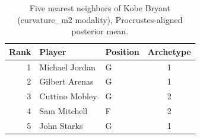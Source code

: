 \begin{table}[htbp]
  \centering\small
  \begin{tabular}{rllc}
    \toprule
    Rank & Player & Position & Archetype \\
    \midrule
    1 & Michael Jordan & G & 1 \\
    2 & Gilbert Arenas & G & 1 \\
    3 & Cuttino Mobley & G & 2 \\
    4 & Sam Mitchell & F & 2 \\
    5 & John Starks & G & 1 \\
    \bottomrule
  \end{tabular}
  \caption{Five nearest neighbors of Kobe Bryant (curvature_m2 modality), Procrustes-aligned posterior mean.}
  \label{tab:Kobe_Bryant_neighbors_curvature_m2}
\end{table}

